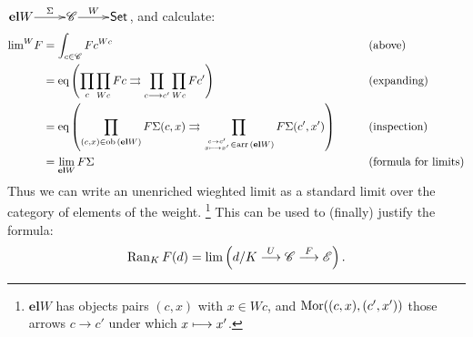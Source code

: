 \documentclass[11pt]{article}
\begin{document}
\begin{8. Weighted limits and colimits}
\begin{itemise}
${\xymatrix@1{
\textbf{el}W
\ar[r]^-{\Sigma}
&%
\scrc
\ar[r]^-{W}
&%
\Set%
}}$, and calculate:
\begin{alignat*}{2}
\textstyle\limit^W\!F
&=
\int_{c\in\scrc}Fc^{Wc}%
&\qquad&\text{(above)}\\
&=
\textup{eq} \left(\prod_{c}\prod_{Wc}Fc \rightrightarrows \prod_{c\to c'}\prod_{Wc}Fc'\right)%
&\qquad&\text{(expanding)}\\
&=
\textup{eq} \left(\prod_{(c,x)\in\ob(\textbf{el}W)} F\Sigma(c,x) \rightrightarrows \prod_{{{c\rightarrow c'}\atop{x\shortmapsto x'}}\in \arr(\textbf{el}W)}F\Sigma(c',x') \right)%
&\qquad&\text{(inspection)}\\
&=
\limit_{\textbf{el}W}F\Sigma%
&\qquad&\text{(formula for limits)}
\end{alignat*}
Thus we can write an unenriched wieghted limit as a standard limit over the category of elements of the weight.%
\footnote{$\textbf{el}W$ has objects pairs $(c,x)$ with $x\in Wc$, and $\operatorname{Mor}((c,x),(c',x'))$ those arrows $c\rightarrow c'$ under which $x\shortmapsto x'$.} This can be used to (finally) justify the formula:
\[\operatorname{Ran}_KF(d)=\lim\left(d/K\overset{U}{\longrightarrow}\mathscr{C}\overset{F}{\longrightarrow}\mathscr{E}\right).\]
\end{itemise}

\end{8. Weighted limits and colimits}
\end{document}
